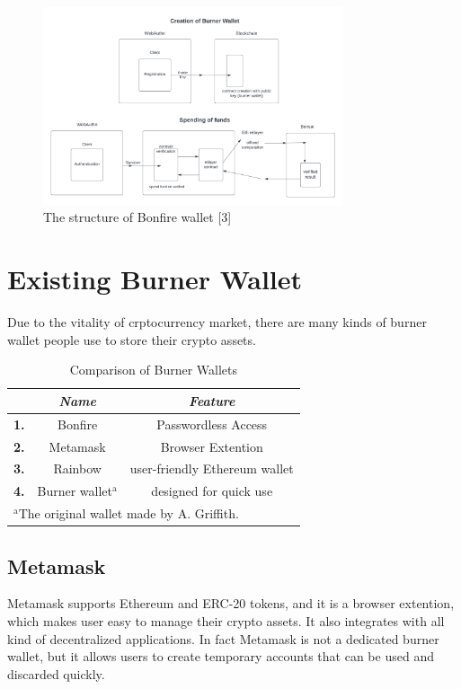 \documentclass[conference]{IEEEtran}
\begin{document}
\begin{figure}[htbp]
    \centerline{\includegraphics[width=250pt]{projects_n1dzp_images_Bonfire Wallet Diagram.png}}\label{fig}
    \caption{The structure of Bonfire wallet [3]}
    \end{figure}

\section{Existing Burner Wallet}
Due to the vitality of crptocurrency market, there are many kinds of burner wallet people use to store 
their crypto assets. 

\begin{table}[htbp]
    \caption{Comparison of Burner Wallets}
    \begin{center}
    \begin{tabular}{|c|c|c|}
    \cline{1-3} 
    \textbf{} & \textbf{\textit{Name}}& \textbf{\textit{Feature}} \\
    \hline
    \textbf{1.} & Bonfire & Passwordless Access\\
    \hline
    \textbf{2.} & Metamask & Browser Extention\\
    \hline
    \textbf{3.} & Rainbow & user-friendly Ethereum wallet\\
    \hline
    \textbf{4.} & Burner wallet$^{\mathrm{a}}$ & designed for quick use\\
    \hline
    \multicolumn{3}{l}{$^{\mathrm{a}}$The original wallet made by A. Griffith.}
    \end{tabular}
    \label{tab1}
    \end{center}
    \end{table}

\subsection{Metamask}
Metamask supports Ethereum and ERC-20 tokens, and it is a browser extention, which makes user easy to 
manage their crypto assets. It also integrates with all kind of decentralized applications. In fact 
Metamask is not a dedicated burner wallet, but it allows users to create temporary accounts that can 
be used and discarded quickly.
\end{document}
